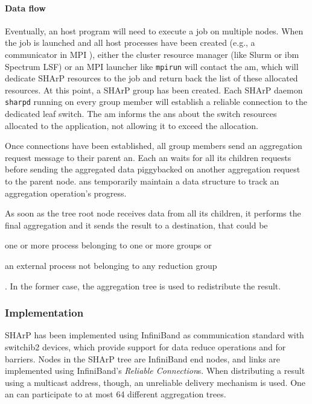 \paragraph{Data flow}
Eventually, an host program will need to execute a job on multiple nodes.
When the job is launched and all host processes have been created (e.g., a communicator in MPI \cite{mpi}), either the cluster resource manager (like Slurm \cite{slurm} or \glsdesc{ibm} Spectrum LSF) or an MPI \cite{mpi} launcher like \texttt{mpirun} will contact the \gls{am}, which will dedicate SHArP \cite{sharp} resources to the job and return back the list of these allocated resources.
At this point, a SHArP \cite{sharp} group has been created.
Each SHArP \cite{sharp} daemon \texttt{sharpd} running on every group member will establish a reliable connection to the dedicated leaf switch.
The \gls{am} informs the \glspl{an} about the switch resources allocated to the application, not allowing it to exceed the allocation.\par
Once connections have been established, all group members send an aggregation request message to their parent \gls{an}.
Each \gls{an} waits for all its children requests before sending the aggregated data piggybacked on another aggregation request to the parent node.
\glspl{an} temporarily maintain a data structure to track an aggregation operation's progress.\par
As soon as the tree root node receives data from all its children, it performs the final aggregation and it sends the result to a destination, that could be
\begin{mylist}
    \item one or more process belonging to one or more groups or
    \item an external process not belonging to any reduction group
\end{mylist}.
In the former case, the aggregation tree is used to redistribute the result.

\subsubsection{Implementation}
SHArP \cite{sharp} has been implemented using InfiniBand \cite{infiniband} as communication standard with \glsdesc{switchib2} devices, which provide support for data reduce operations and for barriers.
Nodes in the SHArP \cite{sharp} tree are InfiniBand \cite{infiniband} end nodes, and links are implemented using InfiniBand's \cite{infiniband} \textit{Reliable Connection}s.
When distributing a result using a multicast address, though, an unreliable delivery mechanism is used.
One \gls{an} can participate to at most 64 different aggregation trees.

